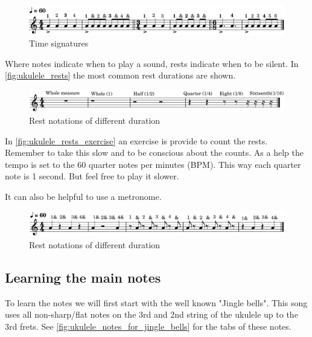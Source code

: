 \begin{figure}[h]
	\centering
	\includegraphics[width=\textwidth]{../../MuseScore/Ukulele/MusicNotation/TimeSignature.png}
	\caption{Time signatures}
	\label{fig:ukulele_time_signatures}
\end{figure}

\newpage

Where notes indicate when to play a sound, rests indicate when to be silent. In \autoref{fig:ukulele_rests} the most common rest durations are shown.

\begin{figure}[h]
	\centering
	\includegraphics[width=\textwidth]{../../MuseScore/Ukulele/UkuleleRests.png}
	\caption{Rest notations of different duration}
	\label{fig:ukulele_rests}
\end{figure}

In \autoref{fig:ukulele_rests_exercise} an exercise is provide to count the rests. Remember to take this slow and to be conscious about the counts. As a help the tempo is set to the 60 quarter notes per minutes (BPM). This way each quarter note is 1 second. But feel free to play it slower.

It can also be helpful to use a metronome.

\begin{figure}[h]
	\centering
	\includegraphics[width=\textwidth]{../../MuseScore/Ukulele/UkuleleRestsExercise.png}
	\caption{Rest notations of different duration}
	\label{fig:ukulele_rests_exercise}
\end{figure}

\newpage

\subsection{Learning the main notes}

To learn the notes we will first start with the well known "Jingle bells". This song uses all non-sharp/flat notes on the 3rd and 2nd string of the ukulele up to the 3rd frets. See \autoref{fig:ukulele_notes_for_jingle_bells} for the tabs of these notes.

